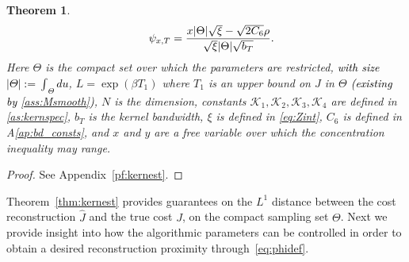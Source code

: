 \documentclass[journal,onecolumn]{IEEEtran}
\newtheorem{theorem}{Theorem}
\newcommand{\rew}{J}
\newcommand{\dimn}{N}
\newcommand{\mk}{\mathcal{K}}
\newcommand{\wassprox}{\rho}
\newcommand{\kfv}{x} %
\newcommand{\zconst}{\xi}
\newcommand{\snum}{T}
\newcommand{\csix}{C_6}
\begin{document}
\begin{theorem}
\begin{align}
\begin{split}
       & \quad \quad \psi_{\kfv,{\color{black}\snum }} = \frac{\kfv|\Theta|\sqrt{\zconst} - \sqrt{2\csix}\wassprox}{\sqrt{\zconst}|\Theta|\sqrt{b_T}}.
    \end{split}
\end{align}
    Here $\Theta$ is the compact set over which the parameters are restricted, \textcolor{black}{with size $|\Theta| := \int_{\Theta}du$},  $L=
\exp(\beta T_1)$ where $T_1$ is an upper bound on $\rew$ in $\Theta$ \textcolor{black}{(existing by \ref{ass:Msmooth})}, $\dimn$ is the dimension, constants $\mk_1, \mk_2,\mk_3,\mk_4$ are defined in \ref{as:kernspec}, $b_T$ is the kernel bandwidth, $\zconst$ is defined in \eqref{eq:Zint},  $\csix$ is defined in A\ref{ap:bd_consts}, and $x$ and $y$ are a free variable over which the concentration inequality may range.  
\end{theorem}
\begin{proof}
See Appendix~\ref{pf:kernest}.
\end{proof}

Theorem~\ref{thm:kernest} provides guarantees on the $L^1$ distance between the cost reconstruction $\hat{\rew}$ and the true cost $\rew$, on the compact sampling set $\Theta$. Next we provide insight into how the algorithmic parameters can be controlled in order to obtain a desired reconstruction proximity through~\eqref{eq:phidef}. 
\end{document}
